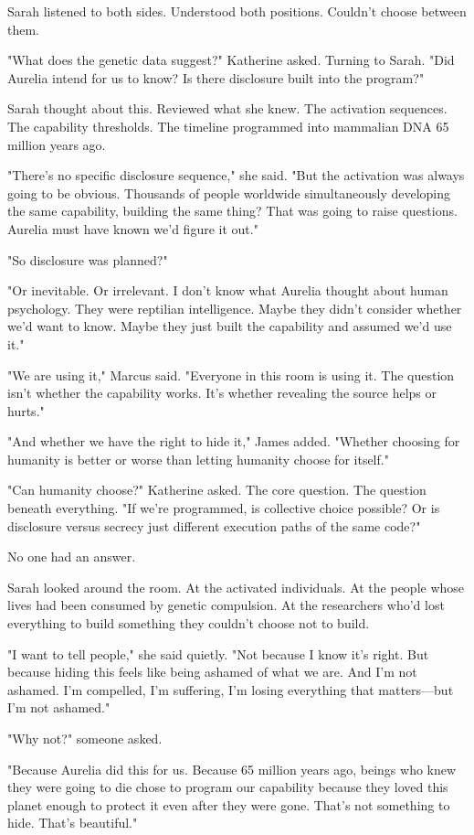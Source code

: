 Sarah listened to both sides. Understood both positions. Couldn't choose between them.

"What does the genetic data suggest?" Katherine asked. Turning to Sarah. "Did Aurelia intend for us to know? Is there disclosure built into the program?"

Sarah thought about this. Reviewed what she knew. The activation sequences. The capability thresholds. The timeline programmed into mammalian DNA 65 million years ago.

"There's no specific disclosure sequence," she said. "But the activation was always going to be obvious. Thousands of people worldwide simultaneously developing the same capability, building the same thing? That was going to raise questions. Aurelia must have known we'd figure it out."

"So disclosure was planned?"

"Or inevitable. Or irrelevant. I don't know what Aurelia thought about human psychology. They were reptilian intelligence. Maybe they didn't consider whether we'd want to know. Maybe they just built the capability and assumed we'd use it."

"We are using it," Marcus said. "Everyone in this room is using it. The question isn't whether the capability works. It's whether revealing the source helps or hurts."

"And whether we have the right to hide it," James added. "Whether choosing for humanity is better or worse than letting humanity choose for itself."

"Can humanity choose?" Katherine asked. The core question. The question beneath everything. "If we're programmed, is collective choice possible? Or is disclosure versus secrecy just different execution paths of the same code?"

No one had an answer.

Sarah looked around the room. At the activated individuals. At the people whose lives had been consumed by genetic compulsion. At the researchers who'd lost everything to build something they couldn't choose not to build.

"I want to tell people," she said quietly. "Not because I know it's right. But because hiding this feels like being ashamed of what we are. And I'm not ashamed. I'm compelled, I'm suffering, I'm losing everything that matters—but I'm not ashamed."

"Why not?" someone asked.

"Because Aurelia did this for us. Because 65 million years ago, beings who knew they were going to die chose to program our capability because they loved this planet enough to protect it even after they were gone. That's not something to hide. That's beautiful."

